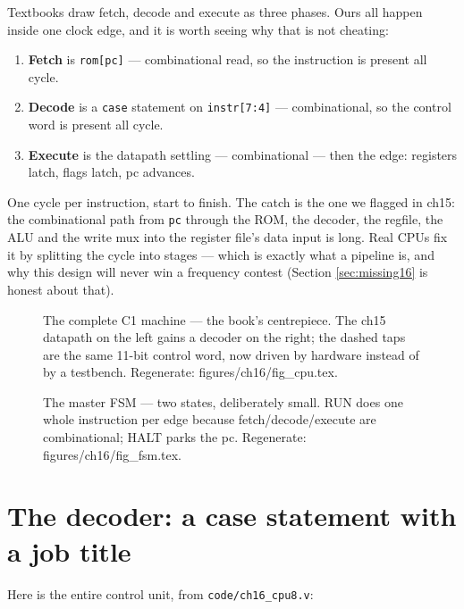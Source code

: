 Textbooks draw fetch, decode and execute as three phases. Ours all
happen inside one clock edge, and it is worth seeing why that is not
cheating:

\begin{enumerate}
\item \textbf{Fetch} is \texttt{rom[pc]} --- combinational read, so
the instruction is present all cycle.
\item \textbf{Decode} is a \texttt{case} statement on
\texttt{instr[7:4]} --- combinational, so the control word is present
all cycle.
\item \textbf{Execute} is the datapath settling --- combinational ---
then the edge: registers latch, flags latch, pc advances.
\end{enumerate}

One cycle per instruction, start to finish. The catch is the one we
flagged in ch15: the combinational path from \texttt{pc} through the
ROM, the decoder, the regfile, the ALU and the write mux into the
register file's data input is long. Real CPUs fix it by splitting the
cycle into stages --- which is exactly what a pipeline is, and why
this design will never win a frequency contest (Section
\ref{sec:missing16} is honest about that).

\begin{figure}[htbp]
\centering

\caption{The complete C1 machine --- the book's centrepiece. The ch15
datapath on the left gains a decoder on the right; the dashed taps
are the same 11-bit control word, now driven by hardware instead of
by a testbench. Regenerate: \ttfamily figures/ch16/fig\_cpu.tex.}
\label{fig:cpu16}
\end{figure}

\begin{figure}[htbp]
\centering

\caption{The master FSM --- two states, deliberately small. RUN does
one whole instruction per edge because fetch/decode/execute are
combinational; HALT parks the pc. Regenerate: \ttfamily
figures/ch16/fig\_fsm.tex.}
\label{fig:fsm16}
\end{figure}

\section{The decoder: a case statement with a job title}\label{sec:decoder16}

Here is the entire control unit, from \texttt{code/ch16\_cpu8.v}:

